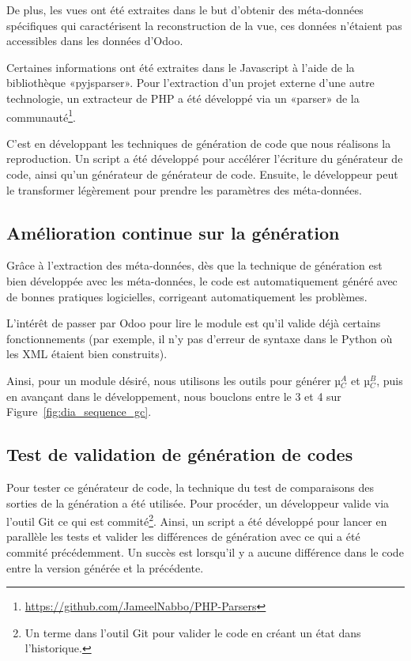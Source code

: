 De plus, les vues ont été extraites dans le but d'obtenir des méta-données spécifiques qui caractérisent la reconstruction de la vue, ces données n’étaient pas accessibles dans les données d'Odoo.

Certaines informations ont été extraites dans le Javascript à l’aide de la bibliothèque «pyjsparser». Pour l’extraction d'un projet externe d'une autre technologie, un extracteur de PHP a été développé via un «parser» de la communauté\footnote{\url{https://github.com/JameelNabbo/PHP-Parsers}}.

C'est en développant les techniques de génération de code que nous réalisons la reproduction. Un script a été développé pour accélérer l’écriture du générateur de code, ainsi qu'un générateur de générateur de code. Ensuite, le développeur peut le transformer légèrement pour prendre les paramètres des méta-données.

\subsection {Amélioration continue sur la génération}

Grâce à l’extraction des méta-données, dès que la technique de génération est bien développée avec les méta-données, le code est automatiquement généré avec de bonnes pratiques logicielles, corrigeant automatiquement les problèmes.

L’intérêt de passer par Odoo pour lire le module est qu'il valide déjà certains fonctionnements (par exemple, il n'y pas d’erreur de syntaxe dans le Python où les XML étaient bien construits).

Ainsi, pour un module désiré, nous utilisons les outils pour générer µ$_C^A$ et µ$_C^B$, puis en avançant dans le développement, nous bouclons entre le 3 et 4 sur Figure~\ref{fig:dia_sequence_gc}.

\subsection {Test de validation de génération de codes}\label{test_validation_generation_code_resultat}

Pour tester ce générateur de code, la technique du test de comparaisons des sorties de la génération a été utilisée. Pour procéder, un développeur valide via l'outil Git ce qui est commité\footnote{Un terme dans l'outil Git pour valider le code en créant un état dans l'historique.}. Ainsi, un script a été développé pour lancer en parallèle les tests et valider les différences de génération avec ce qui a été commité précédemment. Un succès est lorsqu'il y a aucune différence dans le code entre la version générée et la précédente.

